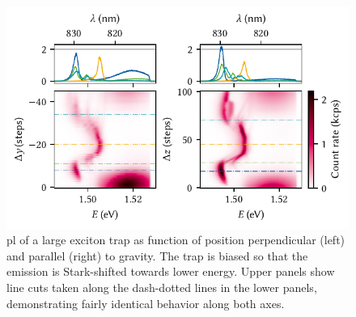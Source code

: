 \begin{figure}
    \centering
    \includegraphics{img/pdf/experiment/doped_M1_05_49-2_positioning}
    \caption[
        $V_{y}=V_{z}=\qty{30}{\volt}$.
        \protect\newline
    ]{
        \Gls{pl} of a large exciton trap as function of position perpendicular (left) and parallel (right) to gravity.
        The trap is biased so that the emission is Stark-shifted towards lower energy.
        Upper panels show line cuts taken along the dash-dotted lines in the lower panels, demonstrating fairly identical behavior along both axes.
    }
    \label{fig:exp:pl:doped_M1_05_49-2_positioning}
\end{figure}


